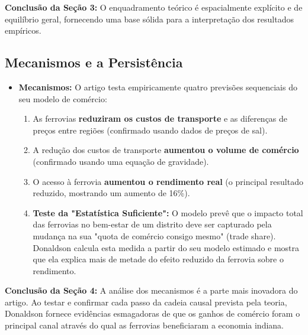 \documentclass[12pt, a4paper]{article}
\begin{document}
\noindent\textbf{Conclusão da Seção 3:} O enquadramento teórico é espacialmente explícito e de equilíbrio geral, fornecendo uma base sólida para a interpretação dos resultados empíricos.

\subsection{Mecanismos e a Persistência}

\begin{itemize}
    \item \textbf{Mecanismos:} O artigo testa empiricamente quatro previsões sequenciais do seu modelo de comércio:
        \begin{enumerate}
            \item As ferrovias \textbf{reduziram os custos de transporte} e as diferenças de preços entre regiões (confirmado usando dados de preços de sal).
            \item A redução dos custos de transporte \textbf{aumentou o volume de comércio} (confirmado usando uma equação de gravidade).
            \item O acesso à ferrovia \textbf{aumentou o rendimento real} (o principal resultado reduzido, mostrando um aumento de 16\%).
            \item \textbf{Teste da "Estatística Suficiente":} O modelo prevê que o impacto total das ferrovias no bem-estar de um distrito deve ser capturado pela mudança na sua "quota de comércio consigo mesmo" (trade share). Donaldson calcula esta medida a partir do seu modelo estimado e mostra que ela explica mais de metade do efeito reduzido da ferrovia sobre o rendimento.
        \end{enumerate}
\end{itemize}

\noindent\textbf{Conclusão da Seção 4:} A análise dos mecanismos é a parte mais inovadora do artigo. Ao testar e confirmar cada passo da cadeia causal prevista pela teoria, Donaldson fornece evidências esmagadoras de que os ganhos de comércio foram o principal canal através do qual as ferrovias beneficiaram a economia indiana.
\end{document}
